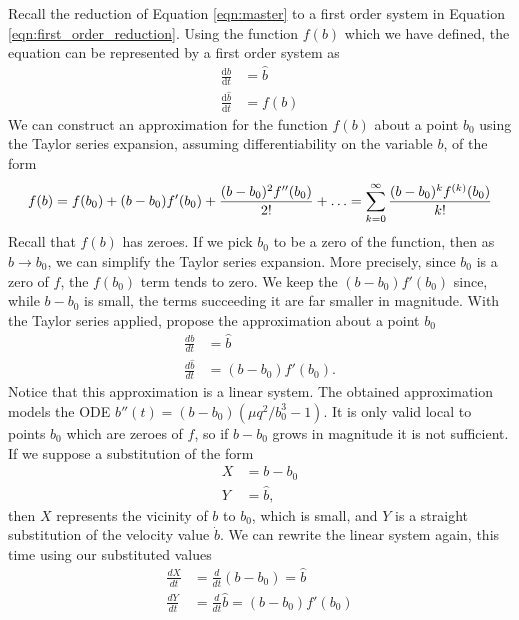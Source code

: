 \documentclass{report}
\begin{document}
Recall the reduction of Equation \ref{eqn:master} to a first order system in Equation \ref{eqn:first_order_reduction}.
Using the function $f(b)$ which we have defined, the equation can be represented by a first order system as
\begin{align}
    \frac{\mathrm{d}b}{\mathrm{d}t} &= \hat{b} \\
    \frac{\mathrm{d}\hat{b}}{\mathrm{d}t} & = f(b)
    \label{eqn:first_order_modified}
\end{align}
We can construct an approximation for the function $f(b)$ about a point $b_0$ using the Taylor series expansion, assuming differentiability on the variable $b$, of the form
\begin{equation}
    f(b) = f(b_0) + (b-b_0)f'(b_0) + \frac{(b-b_0)^2 f''(b_0)}{2!} + \mathellipsis = \sum_{k=0}^\infty\frac{(b-b_0)^{k}f^{(k)}(b_0)}{k!}
    \label{eqn:taylor_series}
\end{equation}
Recall that $f(b)$ has zeroes. If we pick $b_0$ to be a zero of the function, then as $b\rightarrow b_0$,
we can simplify the Taylor series expansion.
More precisely, since $b_0$ is a zero of $f$, the $f(b_0)$ term tends to zero.
We keep the $(b-b_0)f'(b_0)$ since, while $b-b_0$ is small,
the terms succeeding it are far smaller in magnitude.
With the Taylor series applied, propose the approximation about a point $b_0$
\begin{align}
    \frac{db}{dt}       & = \hat{b}         \\
    \frac{d\hat{b}}{dt} & = (b-b_0)f'(b_0).
    \label{eqn:first_order_approximated}
\end{align}
Notice that this approximation is a linear system. The obtained approximation models the ODE $b''(t) = (b-b_0)(\mu q^2/b_0^3-1)$.
It is only valid local to points $b_0$ which are zeroes of $f$, so if $b-b_0$ grows in magnitude it is not sufficient.
If we suppose a substitution of the form
\begin{align}
    X & = b - b_0  \\
    Y & = \hat{b},
\end{align}
then $X$ represents the vicinity of $b$ to $b_0$, which is small,
and $Y$ is a straight substitution of the velocity value $\dot{b}$.
We can rewrite the linear system again, this time using our substituted values
\begin{align}
    \frac{dX}{dt} & = \frac{d}{dt}\left(b-b_0\right) = \hat{b} \\
    \frac{dY}{dt} & = \frac{d}{dt}\hat{b} = (b-b_0)f'(b_0)
\end{align}
\end{document}
